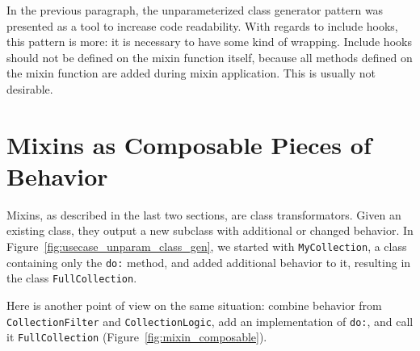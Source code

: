 In the previous paragraph, the unparameterized class generator pattern was presented as a tool to increase code readability. With regards to include hooks, this pattern is more: it is necessary to have some kind of wrapping. Include hooks should not be defined on the mixin function itself, because all methods defined on the mixin function are added during mixin application. This is usually not desirable.

\section{Mixins as Composable Pieces of Behavior}
Mixins, as described in the last two sections, are class transformators. Given an existing class, they output a new subclass with additional or changed behavior. In Figure~\ref{fig:usecase_unparam_class_gen}, we started with \texttt{MyCollection}, a class containing only the \texttt{do:} method, and added additional behavior to it, resulting in the class \texttt{FullCollection}. 

Here is another point of view on the same situation: combine behavior from \texttt{CollectionFilter} and \texttt{CollectionLogic}, add an implementation of \texttt{do:}, and call it \texttt{FullCollection} (Figure~\ref{fig:mixin_composable}).

